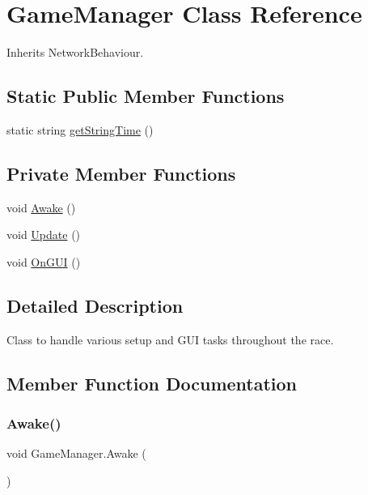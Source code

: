\hypertarget{class_game_manager}{}\section{Game\+Manager Class Reference}
\label{class_game_manager}


Inherits Network\+Behaviour.

\subsection*{Static Public Member Functions}
\begin{DoxyCompactItemize}
\item 
static string \hyperlink{class_game_manager_a3e3ec00ea59fb39386ddd3f1d5bdcd6a}{get\+String\+Time} ()
\end{DoxyCompactItemize}
\subsection*{Private Member Functions}
\begin{DoxyCompactItemize}
\item 
void \hyperlink{class_game_manager_a2959177ee51ac31badbf8b1bc8f7f637}{Awake} ()
\item 
void \hyperlink{class_game_manager_a44c79b205dec16bfe650e21259860c5b}{Update} ()
\item 
void \hyperlink{class_game_manager_a5186f9551988478435e66f7bb71e8898}{On\+G\+UI} ()
\end{DoxyCompactItemize}


\subsection{Detailed Description}
Class to handle various setup and G\+UI tasks throughout the race. 



\subsection{Member Function Documentation}
\mbox{\label{class_game_manager_a2959177ee51ac31badbf8b1bc8f7f637}} 
\subsubsection{\texorpdfstring{Awake()}{Awake()}}
{\footnotesize\ttfamily void Game\+Manager.\+Awake (\begin{DoxyParamCaption}{ }\end{DoxyParamCaption})\hspace{0.3cm}{\ttfamily [private]}}



